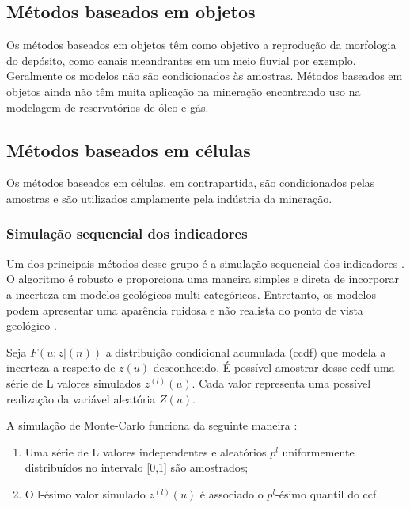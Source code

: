 \subsection{Métodos baseados em objetos}

Os métodos baseados em objetos \cite{pyrcz2014geostatistical} têm como objetivo a reprodução da morfologia do depósito, como canais meandrantes em um meio fluvial por exemplo. Geralmente os modelos não são condicionados às amostras. Métodos baseados em objetos ainda não têm muita aplicação na mineração encontrando uso na modelagem de reservatórios de óleo e gás.

\subsection{Métodos baseados em células}

Os métodos baseados em células, em contrapartida, são condicionados pelas amostras e são utilizados amplamente pela indústria da mineração. 

\subsubsection{Simulação sequencial dos indicadores}

Um dos principais métodos desse grupo é a simulação sequencial dos indicadores \cite{alabert1987stochastic}. O algoritmo é robusto e proporciona uma maneira simples e direta de incorporar a incerteza em modelos geológicos multi-categóricos. Entretanto, os modelos podem apresentar uma aparência ruidosa e não realista do ponto de vista geológico \cite{deutsch2006sequential}.

Seja $F(u;z|(n))$ a distribuição condicional acumulada (ccdf) que modela a incerteza a respeito de $z(u)$ desconhecido. É possível amostrar desse ccdf uma série de L valores simulados $z^{(l)}(u)$. Cada valor representa uma possível realização da variável aleatória $Z(u)$.

A simulação de Monte-Carlo funciona da seguinte maneira \cite{goovaerts1997geostatistics}:

\begin{enumerate}
	\item Uma série de L valores independentes e aleatórios $p^{l}$ uniformemente distribuídos no intervalo [0,1] são amostrados;
	\item O l-ésimo valor simulado $z^{(l)}(u)$ é associado o $p^{l}$-ésimo quantil do ccf.
\end{enumerate}

